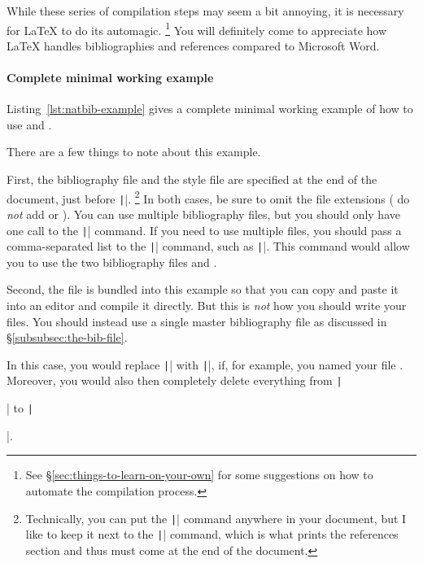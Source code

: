 While these series of compilation steps may seem a bit annoying, it is necessary for \LaTeX{} to do its automagic.%
\footnote{%
See \S\ref{sec:things-to-learn-on-your-own} for some suggestions on how to automate the compilation process.%
}
You will definitely come to appreciate how \LaTeX{} handles bibliographies and references compared to Microsoft Word.

\paragraph{Complete minimal working example}

Listing~\ref{lst:natbib-example} gives a complete minimal working example of how to use  and .

There are a few things to note about this example.

First, the bibliography file and the style file are specified at the end of the document, just before \texttt||.%
\footnote{%
Technically, you can put the \texttt|| command anywhere in your document, but I like to keep it next to the \texttt|| command, which is what prints the references section and thus must come at the end of the document.%
}
In both cases, be sure to omit the file extensions (\IE{} do \emph{not} add  or ).
You can use multiple bibliography files, but you should only have one call to the \texttt|| command.
If you need to use multiple  files, you should pass a comma-separated list to the \texttt|| command, such as \texttt||.
This command would allow you to use the two bibliography files  and .

Second, the  file is bundled into this example so that you can copy and paste it into an editor and compile it directly.
But this is \emph{not} how you should write your  files.
You should instead use a single master bibliography file as discussed in \S\ref{subsubsec:the-bib-file}.

In this case, you would replace \texttt|| with \texttt||, if, for example, you named your  file .
Moreover, you would also then completely delete everything from \texttt|\begin{filecontents}| to \texttt|\end{filecontents}|.

